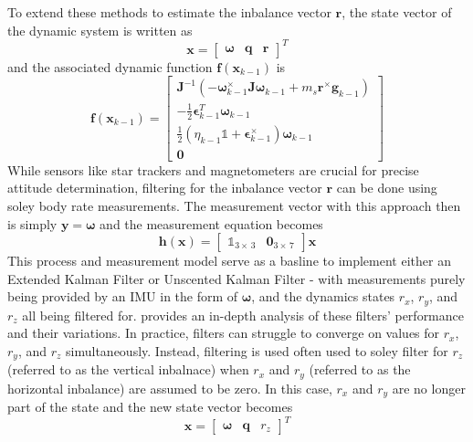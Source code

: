 To extend these methods to estimate the inbalance vector $\bm{r}$, the state vector of the dynamic system is written as 
\begin{equation}
    \bm{x} = \begin{bmatrix} \bm{\omega} & \bm{q} & \bm{r} \end{bmatrix}^T
\end{equation}
and the associated dynamic function $\bm{f}(\bm{x}_{k-1})$ is
\begin{equation}
    \bm{f}(\bm{x}_{k-1}) = \begin{bmatrix}
        \bm{J}^{-1}(-\bm{\omega}_{k-1}^\times \bm{J\omega}_{k-1} + m_s\bm{r}^{\times}\bm{g}_{k-1})
        \\
        -\frac{1}{2}\bm{\epsilon}_{k-1}^T\bm{\omega}_{k-1} 
        \\
        \frac{1}{2}(\eta_{k-1}\mathbb{1} + \bm{\epsilon}_{k-1}^{\times})\bm{\omega}_{k-1}
        \\
        \bm{0}
    \end{bmatrix}
\end{equation}
 While sensors like star trackers and magnetometers are crucial for precise attitude determination, filtering for the inbalance vector $\bm{r}$ can be done using soley body rate measurements. The measurement vector with this approach then is simply $\bm{y}=\bm{\omega}$ and the measurement equation becomes
\begin{equation}
    \bm{h}(\bm{x})=
    \begin{bmatrix}
        \mathbb{1}_{3\times\,3} & \bm{0}_{3\times\,7}
    \end{bmatrix}\bm{x}
\end{equation}
This process and measurement model serve as a basline to implement either an Extended Kalman Filter or Unscented Kalman Filter - with measurements purely being provided by an IMU in the form of $\bm{\omega}$, and the dynamics states $r_x$, $r_y$, and $r_z$ all being filtered for. \cite{silva_filtering_2018} provides an in-depth analysis of these filters' performance and their variations. In practice, filters can struggle to converge on values for $r_x$, $r_y$, and $r_z$ simultaneously. Instead, filtering is used often used to soley filter for $r_z$ (referred to as the vertical inbalnace) when $r_x$ and $r_y$ (referred to as the horizontal inbalance) are assumed to be zero. In this case, $r_x$ and $r_y$ are no longer part of the state and the new state vector becomes
\begin{equation}
    \bm{x} = \begin{bmatrix} \bm{\omega} & \bm{q} & r_z \end{bmatrix}^T
\end{equation}

